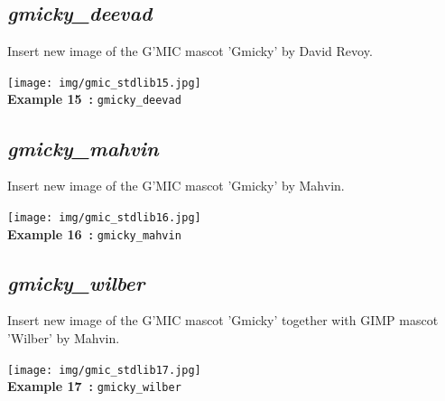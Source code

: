 \documentclass[a4paper,10.5pt,twoside]{book}
\def\comma{\discretionary{,}{}{,}}
\begin{document}
\subsection{\emph{gmicky\_deevad} }\vspace*{-0.7em}
Insert new image of the G'MIC mascot 'Gmicky'{\comma} by David Revoy.
\begin{center}\texttt{[image: img/gmic\_stdlib15.jpg]}\\
{\footnotesize \textbf{Example 15~:} \texttt{gmicky\_deevad}}
\end{center}

\subsection{\emph{gmicky\_mahvin} }\vspace*{-0.7em}
Insert new image of the G'MIC mascot 'Gmicky'{\comma} by Mahvin.
\begin{center}\texttt{[image: img/gmic\_stdlib16.jpg]}\\
{\footnotesize \textbf{Example 16~:} \texttt{gmicky\_mahvin}}
\end{center}

\subsection{\emph{gmicky\_wilber} }\vspace*{-0.7em}
Insert new image of the G'MIC mascot 'Gmicky' together with GIMP mascot 'Wilber'{\comma} by Mahvin.
\begin{center}\texttt{[image: img/gmic\_stdlib17.jpg]}\\
{\footnotesize \textbf{Example 17~:} \texttt{gmicky\_wilber}}
\end{center}
\end{document}
